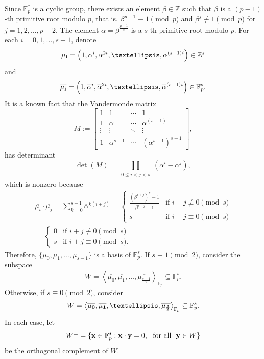 \documentclass[10pt,a4paper]{amsart}
\begin{document}
Since $\mathbb{F}_p^*$ is a cyclic group, there exists an element $\beta\in\mathbb{Z}$ such that $\beta$ is a $(p-1)$-th primitive root modulo $p$, that is, $\beta^{p-1}\equiv 1\pmod p$ and $\beta^j\not\equiv 1\pmod p$ for $j=1,2,\ldots,p-2$. The element $\alpha=\beta^{\frac{p-1}{s}}$ is a $s$-th primitive root modulo $p$. For each $i=0,1,\ldots,s-1$, denote \begin{equation} \label{eq-0} {\bf \mu_i}= \left(1,\alpha^i,\alpha^{2i},\ldots,\alpha^{(s-1)i}\right) \in \mathbb{Z}^s \end{equation} and \[ \overline{{\bf \mu_i}} = \left(1,\overline{\alpha}^i,\overline{\alpha}^{2i},\ldots,\overline{\alpha}^{(s-1)i}\right) \in \mathbb{F}_p^s. \] It is a known fact that the Vandermonde matrix \[ M := \left[ \begin{array}{cccc} 1 & 1 & \cdots & 1\\ 1 & \overline{\alpha} & \cdots & \overline{\alpha}^{(s-1)} \\ \vdots & \vdots & \ddots & \vdots \\ 1 & \overline{\alpha}^{s-1} & \cdots & (\overline{\alpha}^{s-1})^{s-1} \end{array} \right], \] has determinant
\[ \det(M) = \prod_{\substack{0\leq i<j<s}}(\overline{\alpha}^i-\overline{\alpha}^j), \] which is nonzero because
\begin{multline}\label{eq-1} \overline{\mu_i}\cdot\overline{\mu_j}  = \sum_{k=0}^{s-1} \overline{\alpha}^{k(i+j)} = \begin{cases} \frac{(\beta^{i+j})^s-1}{\beta^{i+j}-1} & \mbox{if } i+j\not\equiv 0\pmod s\\ s & \mbox{if } i+j\equiv 0\pmod s    \end{cases}\\ =  \begin{cases}
0 & \mbox{if } i+j\not\equiv 0\pmod s\\ s & \mbox{if } i+j\equiv 0\pmod s.\end{cases} \end{multline} Therefore, $\{\overline{\mu_0},\overline{\mu_1},\ldots,\overline{\mu_{s-1}}\}$ is a basis of $\mathbb{F}_p^s$.
If $s\equiv 1\pmod 2$, consider the subspace \[ W = \left\langle\overline{\mu_0},\overline{\mu_1},\ldots,\overline{\mu_{\frac{s-1}{2}}}\right\rangle_{\mathbb{F}_p} \subseteq\mathbb{F}_p^s. \]
Otherwise, if $s\equiv 0\pmod 2$, consider
\[  W=\left\langle\overline{\bf \mu_0},\overline{\bf \mu_1},\ldots,\overline{\bf \mu_{\frac{s}{2}}}\right\rangle_{\mathbb{F}_p} \subseteq\mathbb{F}_p^s. \] In each case, let \[ W^{\perp} = \{ {\bf x} \in \mathbb{F}_p^s:{\bf x}\cdot{\bf y}=0, \ \ \mbox{for all} \ \ {\bf y}\in W\} \] be the orthogonal complement of $W$.
\end{document}
